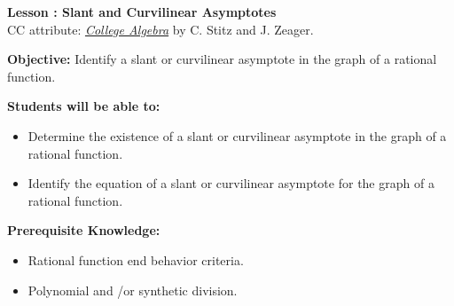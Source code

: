 \documentclass[12pt]{article}
\theoremstyle{definition}
\begin{document}
{\bf \large Lesson : Slant and Curvilinear Asymptotes}\label{les:slant_and_curvilinear_asymptotes}
\\ CC attribute: \href{http://www.stitz-zeager.com}{\it{College Algebra}} by C. Stitz and J. Zeager. 
\hfill \doclicenseImage[imagewidth=5em]\\
\par
{\bf Objective:} Identify a slant or curvilinear asymptote in the graph of a rational function.\\
\par
{\bf Students will be able to:}
\begin{itemize}
	\item Determine the existence of a slant or curvilinear asymptote in the graph of a rational function.
	\item Identify the equation of a slant or curvilinear asymptote for the graph of a rational function.
\end{itemize}
{\bf Prerequisite Knowledge:}
\begin{itemize}
	\item Rational function end behavior criteria.
	\item Polynomial and \slash or synthetic division.
\end{itemize}
\hrulefill
\end{document}

